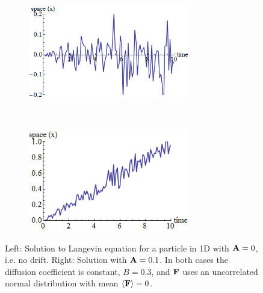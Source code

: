 \documentclass[Main.tex]{subfiles}
\begin{document}
\begin{figure}[!ht]
\centering\begin{subfigure}{.5\textwidth}
\centering\includegraphics[width=7cm]{assets/LanNoDrift.png}
\end{subfigure}~
\centering\begin{subfigure}{.5\textwidth}
\centering\includegraphics[width=7cm]{assets/LanDrift.png}
\end{subfigure}
\caption{Left: Solution to Langevin equation for a particle in 1D with $\mathbf{A} = 0$, i.e. no drift. Right: Solution with $\mathbf{A} = 0.1$. In both cases the diffusion coefficient is constant, $B = 0.3$, and $\mathbf{F}$ uses an uncorrelated normal distribution with mean $\left<\mathbf{F}\right> = 0$.}\label{fig:lan}
\end{figure}
\end{document}
